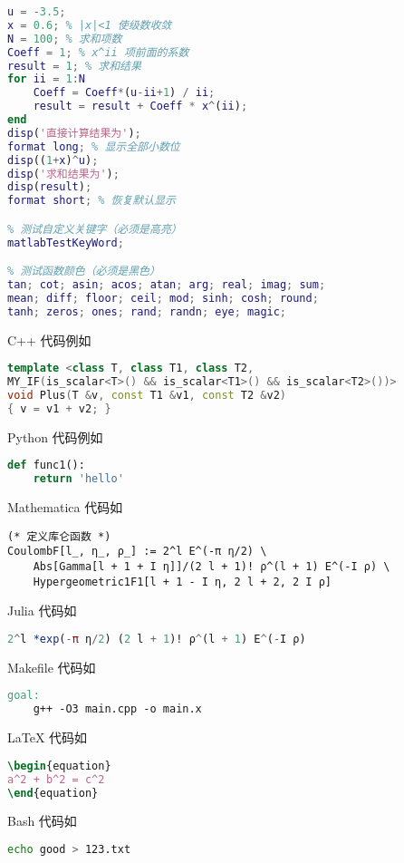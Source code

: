 \begin{lstlisting}[language=matlab, caption=sample\_code.m]
% 验证二项式定理(非整数幂)
u = -3.5;
x = 0.6; % |x|<1 使级数收敛
N = 100; % 求和项数
Coeff = 1; % x^ii 项前面的系数
result = 1; % 求和结果
for ii = 1:N
    Coeff = Coeff*(u-ii+1) / ii;
    result = result + Coeff * x^(ii);
end
disp('直接计算结果为');
format long; % 显示全部小数位
disp((1+x)^u);
disp('求和结果为');
disp(result);
format short; % 恢复默认显示

% 测试自定义关键字（必须是高亮）
matlabTestKeyWord;

% 测试函数颜色（必须是黑色）
tan; cot; asin; acos; atan; arg; real; imag; sum;
mean; diff; floor; ceil; mod; sinh; cosh; round;
tanh; zeros; ones; rand; randn; eye; magic;
\end{lstlisting}

C++ 代码例如
\begin{lstlisting}[language=cpp]
template <class T, class T1, class T2,
MY_IF(is_scalar<T>() && is_scalar<T1>() && is_scalar<T2>())>
void Plus(T &v, const T1 &v1, const T2 &v2)
{ v = v1 + v2; }
\end{lstlisting}

Python 代码例如
\begin{lstlisting}[language=python]
def func1():
	return 'hello'
\end{lstlisting}

Mathematica 代码如
\begin{lstlisting}[language=mma]
(* 定义库仑函数 *)
CoulombF[l_, η_, ρ_] := 2^l E^(-π η/2) \
    Abs[Gamma[l + 1 + I η]]/(2 l + 1)! ρ^(l + 1) E^(-I ρ) \
    Hypergeometric1F1[l + 1 - I η, 2 l + 2, 2 I ρ]
\end{lstlisting}

Julia 代码如
\begin{lstlisting}[language=julia]
2^l *exp(-π η/2) (2 l + 1)! ρ^(l + 1) E^(-I ρ)
\end{lstlisting}

Makefile 代码如
\begin{lstlisting}[language=Makefile]
goal:
    g++ -O3 main.cpp -o main.x
\end{lstlisting}

LaTeX 代码如
\begin{lstlisting}[language=latex]
\begin{equation}
a^2 + b^2 = c^2
\end{equation}
\end{lstlisting}

Bash 代码如
\begin{lstlisting}[language=bash]
echo good > 123.txt
\end{lstlisting}

